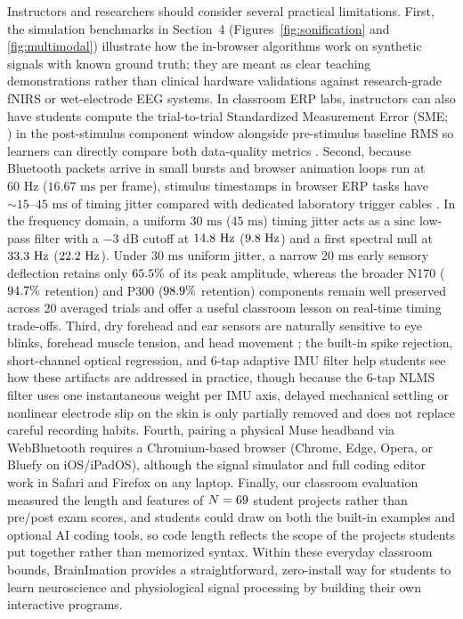 \documentclass[11pt]{article}
\begin{document}
Instructors and researchers should consider several practical limitations. First, the simulation benchmarks in Section~4 (Figures~\ref{fig:sonification} and \ref{fig:multimodal}) illustrate how the in-browser algorithms work on synthetic signals with known ground truth; they are meant as clear teaching demonstrations rather than clinical hardware validations against research-grade fNIRS or wet-electrode EEG systems. In classroom ERP labs, instructors can also have students compute the trial-to-trial Standardized Measurement Error (SME; \citealp{luck2021standardized}) in the post-stimulus component window alongside pre-stimulus baseline RMS so learners can directly compare both data-quality metrics \citep{picton2000guidelines,keil2014committee}. Second, because Bluetooth packets arrive in small bursts and browser animation loops run at $60\text{ Hz}$ ($16.67\text{ ms}$ per frame), stimulus timestamps in browser ERP tasks have $\sim 15\text{--}45\text{ ms}$ of timing jitter compared with dedicated laboratory trigger cables \citep{krigolson2017choosing,kuziek2017transitioning,kuziek2018increasing}. In the frequency domain, a uniform $30\text{ ms}$ ($45\text{ ms}$) timing jitter acts as a $\text{sinc}$ low-pass filter with a $-3\text{ dB}$ cutoff at $14.8\text{ Hz}$ ($9.8\text{ Hz}$) and a first spectral null at $33.3\text{ Hz}$ ($22.2\text{ Hz}$). Under $30\text{ ms}$ uniform jitter, a narrow $20\text{ ms}$ early sensory deflection retains only $65.5\%$ of its peak amplitude, whereas the broader N170 ($94.7\%$ retention) and P300 ($98.9\%$ retention) components remain well preserved across 20 averaged trials and offer a useful classroom lesson on real-time timing trade-offs. Third, dry forehead and ear sensors are naturally sensitive to eye blinks, forehead muscle tension, and head movement \citep{lotte2013flaws,mathewson2017high,saager2005direct}; the built-in spike rejection, short-channel optical regression, and 6-tap adaptive IMU filter help students see how these artifacts are addressed in practice, though because the 6-tap NLMS filter uses one instantaneous weight per IMU axis, delayed mechanical settling or nonlinear electrode slip on the skin is only partially removed and does not replace careful recording habits. Fourth, pairing a physical Muse headband via WebBluetooth requires a Chromium-based browser (Chrome, Edge, Opera, or Bluefy on iOS/iPadOS), although the signal simulator and full coding editor work in Safari and Firefox on any laptop. Finally, our classroom evaluation measured the length and features of $N = 69$ student projects rather than pre/post exam scores, and students could draw on both the built-in examples and optional AI coding tools, so code length reflects the scope of the projects students put together rather than memorized syntax. Within these everyday classroom bounds, BrainImation provides a straightforward, zero-install way for students to learn neuroscience and physiological signal processing by building their own interactive programs.
\end{document}
